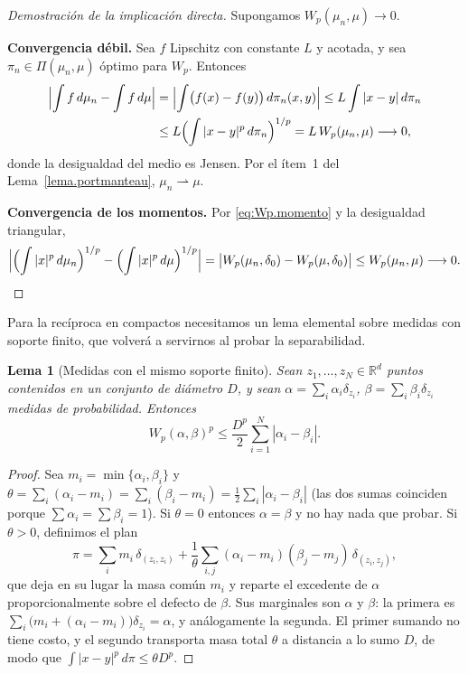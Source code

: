 \documentclass[12pt, a4paper]{amsbook}
\newcommand{\R}{{\mathbb R}}
\newtheorem{lema}[teo]{Lema}
\theoremstyle{remark}
\theoremstyle{definition}
\numberwithin{section}{chapter}
\numberwithin{subsection}{section}
\numberwithin{equation}{section}
\numberwithin{figure}{chapter}
\begin{document}
\begin{proof}[Demostración de la implicación directa]
Supongamos $W_p(\mu_n,\mu)\to0$.

\medskip
\textbf{Convergencia débil.} Sea $f$ Lipschitz con constante $L$ y acotada, y
sea $\pi_n\in\Pi(\mu_n,\mu)$ óptimo para $W_p$. Entonces
\[
\begin{aligned}
\Bigl|\int f\,d\mu_n-\int f\,d\mu\Bigr|
&=\Bigl|\int\bigl(f(x)-f(y)\bigr)\,d\pi_n(x,y)\Bigr|
\le L\int|x-y|\,d\pi_n\\
&\le L\Bigl(\int|x-y|^p\,d\pi_n\Bigr)^{1/p}
=L\,W_p(\mu_n,\mu)\longrightarrow0,
\end{aligned}
\]
donde la desigualdad del medio es Jensen. Por el ítem~1 del
Lema~\ref{lema.portmanteau}, $\mu_n\rightharpoonup\mu$.

\medskip
\textbf{Convergencia de los momentos.} Por \eqref{eq:Wp.momento} y la
desigualdad triangular,
\[
\Bigl|\Bigl(\int|x|^p\,d\mu_n\Bigr)^{1/p}-\Bigl(\int|x|^p\,d\mu\Bigr)^{1/p}\Bigr|
=\bigl|W_p(\mu_n,\delta_0)-W_p(\mu,\delta_0)\bigr|
\le W_p(\mu_n,\mu)\longrightarrow0.
\]
\end{proof}

Para la recíproca en compactos necesitamos un lema elemental sobre medidas
con soporte finito, que volverá a servirnos al probar la separabilidad.

\begin{lema}[Medidas con el mismo soporte finito]\label{lema.Wp.finito}
Sean $z_1,\dots,z_N\in\R^d$ puntos contenidos en un conjunto de diámetro $D$,
y sean $\alpha=\sum_i\alpha_i\delta_{z_i}$, $\beta=\sum_i\beta_i\delta_{z_i}$
medidas de probabilidad. Entonces
\[
W_p(\alpha,\beta)^p\le\frac{D^p}{2}\sum_{i=1}^N|\alpha_i-\beta_i|.
\]
\end{lema}

\begin{proof}
Sea $m_i=\min\{\alpha_i,\beta_i\}$ y $\theta=\sum_i(\alpha_i-m_i)=\sum_i(\beta_i-m_i)=\tfrac12\sum_i|\alpha_i-\beta_i|$
(las dos sumas coinciden porque $\sum\alpha_i=\sum\beta_i=1$). Si $\theta=0$
entonces $\alpha=\beta$ y no hay nada que probar. Si $\theta>0$, definimos el
plan
\[
\pi=\sum_im_i\,\delta_{(z_i,z_i)}
+\frac1\theta\sum_{i,j}(\alpha_i-m_i)(\beta_j-m_j)\,\delta_{(z_i,z_j)},
\]
que deja en su lugar la masa común $m_i$ y reparte el excedente de $\alpha$
proporcionalmente sobre el defecto de $\beta$. Sus marginales son $\alpha$ y
$\beta$: la primera es $\sum_i\bigl(m_i+(\alpha_i-m_i)\bigr)\delta_{z_i}=\alpha$,
y análogamente la segunda. El primer sumando no tiene costo, y el segundo
transporta masa total $\theta$ a distancia a lo sumo $D$, de modo que
$\int|x-y|^p\,d\pi\le\theta D^p$.
\end{proof}
\end{document}
